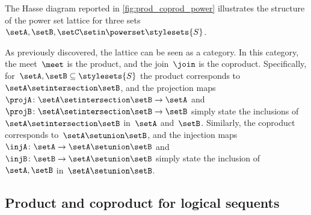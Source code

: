 \begin{marginfigure}
    \centering
    \caption{}
    \label{fig:prod_coprod_power}
\end{marginfigure}

The Hasse diagram reported in \cref{fig:prod_coprod_power} illustrates the structure of the power set lattice for three sets~$\setA,\setB,\setC\setin \powerset \stylesets{S}$.

As previously discovered, the lattice can be seen as a category.
In this category, the meet~$\meet$ is the product, and the join~$\join$ is the coproduct.
Specifically, for~$\setA,\setB\subseteq\stylesets{S}$ the product corresponds to~$\setA\setintersection \setB$, and the projection maps~$\projA\colon \setA\setintersection \setB\to \setA$ and~$\projB\colon \setA\setintersection \setB\to \setB$ simply state the inclusions of~$\setA\setintersection \setB$ in~$\setA$ and~$\setB$.
Similarly, the coproduct corresponds to~$\setA\setunion \setB$, and the injection maps~$\injA\colon \setA\to \setA\setunion \setB$ and~$\injB\colon \setB\to \setA\setunion \setB$ simply state the inclusion of~$\setA,\setB$ in~$\setA\setunion \setB$.

\subsection{Product and coproduct for logical sequents}

